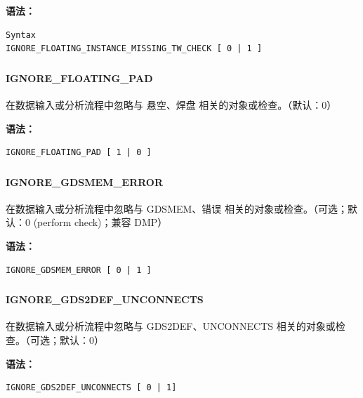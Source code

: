 \textbf{语法：}
\begin{lstlisting}
Syntax
IGNORE_FLOATING_INSTANCE_MISSING_TW_CHECK [ 0 | 1 ]
\end{lstlisting}

\subsubsection{}
\paragraph*{IGNORE_FLOATING_PAD}

在数据输入或分析流程中忽略与 悬空、焊盘 相关的对象或检查。（默认：0）

\textbf{语法：}
\begin{lstlisting}
IGNORE_FLOATING_PAD [ 1 | 0 ]
\end{lstlisting}

\subsubsection{}
\paragraph*{IGNORE_GDSMEM_ERROR}

在数据输入或分析流程中忽略与 GDSMEM、错误 相关的对象或检查。（可选；默认：0 (perform check)；兼容 DMP）

\textbf{语法：}
\begin{lstlisting}
IGNORE_GDSMEM_ERROR [ 0 | 1 ]
\end{lstlisting}

\subsubsection{}
\paragraph*{IGNORE_GDS2DEF_UNCONNECTS}

在数据输入或分析流程中忽略与 GDS2DEF、UNCONNECTS 相关的对象或检查。（可选；默认：0）

\textbf{语法：}
\begin{lstlisting}
IGNORE_GDS2DEF_UNCONNECTS [ 0 | 1]
\end{lstlisting}

\subsubsection{}
